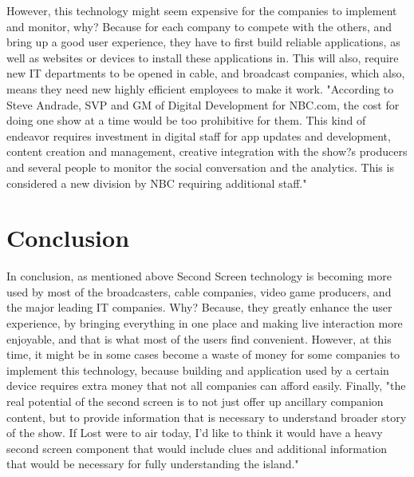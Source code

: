 \documentclass[12pt, oneside]{amsart}   	%
\begin{document}
 However, this technology might seem expensive for the companies to implement and monitor, why?  Because for each company to compete with the others, and bring up a good user experience, they have to first build reliable applications, as well as websites or devices to install these applications in.  This will also, require new IT departments to be opened in cable, and broadcast companies, which also, means they need new highly efficient employees to make it work.  "According to Steve Andrade, SVP and GM of Digital Development for NBC.com, the cost for doing one show at a time would be too prohibitive for them. This kind of endeavor requires investment in digital staff for app updates and development, content creation and management, creative integration with the show?s producers and several people to monitor the social conversation and the analytics. This is considered a new division by NBC requiring additional staff." \cite{Second-Screen-Art}

 \section{Conclusion}

In conclusion, as mentioned above Second Screen technology is becoming more used by most of the broadcasters, cable companies, video game producers, and the major leading IT companies.  Why? Because, they greatly enhance the user experience, by bringing everything in one place and making live interaction more enjoyable, and that is what most of the users find convenient. However, at this time, it might be in some cases become a waste of money for some companies to implement this technology, because building and application used by a certain device requires extra money that not all companies can afford easily.  Finally, "the real potential of the second screen is to not just offer up ancillary companion content, but to provide information that is necessary to understand broader story of the show. If Lost were to air today, I'd like to think it would have a heavy second screen component that would include clues and additional information that would be necessary for fully understanding the island."\cite{Second-Screen-His}
 
 

 
 
\end{document}
